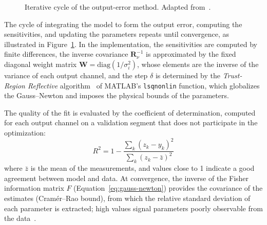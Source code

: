 \documentclass{ieeeaccess}
\begin{document}
\begin{figure}[!t]
{%
}
\caption{Iterative cycle of the output-error method. Adapted from~\cite{c2}.}
\label{fig:opt_loop}
\end{figure}

The cycle of integrating the model to form the output error, computing the sensitivities, and updating the parameters repeats until convergence, as illustrated in Figure~\ref{fig:opt_loop}. In the implementation, the sensitivities are computed by finite differences, the inverse covariance $\mathbf{R}_\nu^{-1}$ is approximated by the fixed diagonal weight matrix $\mathbf{W} = \mathrm{diag}(1/\sigma_i^2)$, whose elements are the inverse of the variance of each output channel, and the step $\delta$ is determined by the \textit{Trust-Region Reflective} algorithm~\cite{c2} of MATLAB's \texttt{lsqnonlin} function, which globalizes the Gauss--Newton and imposes the physical bounds of the parameters.

The quality of the fit is evaluated by the coefficient of determination, computed for each output channel on a validation segment that does not participate in the optimization:
\begin{equation}
R^2 = 1 - \frac{\sum_{k}(z_k - y_k)^2}{\sum_{k}(z_k - \bar{z})^2}
\label{eq:r2}
\end{equation}
where $\bar{z}$ is the mean of the measurements, and values close to 1 indicate a good agreement between model and data. At convergence, the inverse of the Fisher information matrix $F$ (Equation~\eqref{eq:gauss-newton}) provides the covariance of the estimates (Cramér--Rao bound), from which the relative standard deviation of each parameter is extracted; high values signal parameters poorly observable from the data~\cite{c2}.
\end{document}
